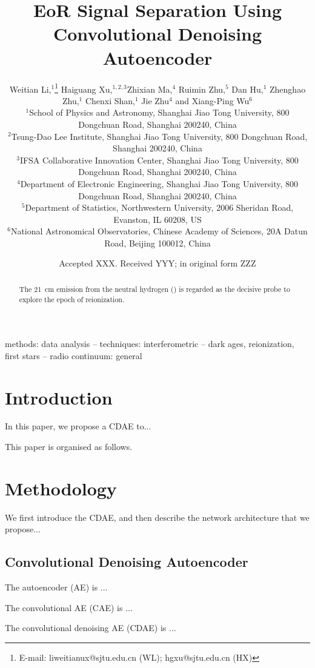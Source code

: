 \documentclass[letters,a4paper,fleqn,usenatbib]{mnras}
\title[EoR Separation with CDAE]{%
  EoR Signal Separation Using Convolutional Denoising Autoencoder
}
\author[Li~et~al.]{%
Weitian Li,$^{1}$\thanks{%
  E-mail: liweitianux@sjtu.edu.cn (WL); hgxu@sjtu.edu.cn (HX)}
Haiguang Xu,$^{1,2,3}$\footnotemark[1]
Zhixian Ma,$^{4}$
Ruimin Zhu,$^{5}$
Dan Hu,$^{1}$
Zhenghao Zhu,$^{1}$
\newauthor
Chenxi Shan,$^{1}$
Jie Zhu$^{4}$
and
Xiang-Ping Wu$^{6}$
\\
$^{1}${School of Physics and Astronomy,
  Shanghai Jiao Tong University,
  800 Dongchuan Road, Shanghai 200240, China} \\
$^{2}${Tsung-Dao Lee Institute,
  Shanghai Jiao Tong University,
  800 Dongchuan Road, Shanghai 200240, China} \\
$^{3}${IFSA Collaborative Innovation Center,
  Shanghai Jiao Tong University,
  800 Dongchuan Road, Shanghai 200240, China} \\
$^{4}${Department of Electronic Engineering,
  Shanghai Jiao Tong University,
  800 Dongchuan Road, Shanghai 200240, China} \\
$^{5}${Department of Statistics,
  Northwestern University,
  2006 Sheridan Road, Evanston, IL 60208, US} \\
$^{6}${National Astronomical Observatories,
  Chinese Academy of Sciences,
  20A Datun Road, Beijing 100012, China}
}
\date{Accepted XXX. Received YYY; in original form ZZZ}
\begin{document}
\label{firstpage}
\pagerange{\pageref{firstpage}--\pageref{lastpage}}
\maketitle

%
%
\begin{abstract}
The \SI{21}{\cm} emission from the neutral hydrogen ()
is regarded as the decisive probe to explore the epoch of reionization.
\end{abstract}

\begin{keywords}
methods: data analysis --
techniques: interferometric --
dark ages, reionization, first stars --
radio continuum: general
\end{keywords}



\section{Introduction}
\label{sec:intro}

In this paper, we propose a CDAE to...

This paper is organised as follows.


\section{Methodology}
\label{sec:method}

We first introduce the CDAE, and then describe the network architecture
that we propose...


\subsection{Convolutional Denoising Autoencoder}
\label{sec:cdae}

The autoencoder (AE) is ...

The convolutional AE (CAE) is ...

The convolutional denoising AE (CDAE) is ...
\end{document}
